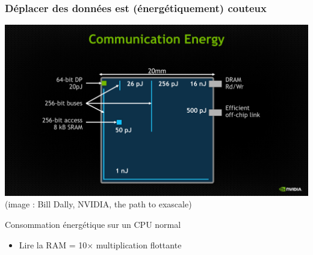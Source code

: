 \documentclass[xcolor={x11names,svgnames}]{beamer}
\begin{document}

\begin{frame}
  \frametitle{Déplacer des données est (énergétiquement) couteux}

  \begin{center}
    \includegraphics[width=\textwidth,clip,trim=0 0 0 3.5cm]{nvidia.pdf}
    \footnotesize (image : Bill Dally, NVIDIA, \og the path to exascale\fg)
  \end{center}

  \begin{block}{Consommation énergétique sur un CPU normal}
    \begin{itemize}
    \item Lire la RAM = 10$\times$ multiplication flottante
    \end{itemize}
  \end{block}
\end{frame}

\end{document}
